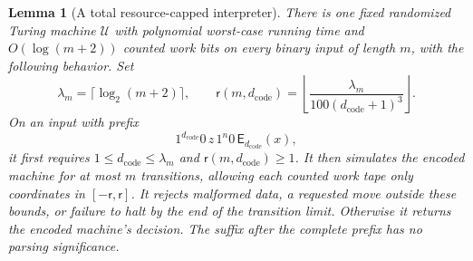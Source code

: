 \documentclass[11pt]{article}
\numberwithin{equation}{section}
\newtheorem{lemma}[theorem]{Lemma}
\theoremstyle{definition}
\theoremstyle{remark}
\begin{document}
\begin{lemma}[A total resource-capped interpreter]
\label{lem:compiler-interpreter}
There is one fixed randomized Turing machine ${\mathcal{U}}$ with polynomial
worst-case running time and $O(\log(m+2))$ counted work bits on every
binary input of length $m$, with the following behavior.
Set
\begin{equation}\label{eq:compiler-interpreter-cap}
 \lambda_m=\lceil\log_2(m+2)\rceil,
 \qquad
 {\mathsf{r}}(m,d_{\mathrm{code}})
   =\left\lfloor\frac{\lambda_m}
       {100(d_{\mathrm{code}}+1)^3}\right\rfloor.
\end{equation}
On an input with prefix
\begin{equation}\label{eq:compiler-prefix}
  1^{d_{\mathrm{code}}}0\,z\,1^n0\,
  {\mathsf{E}}_{d_{\mathrm{code}}}(x),
\end{equation}
it first requires $1\le d_{\mathrm{code}}\le\lambda_m$ and
${\mathsf{r}}(m,d_{\mathrm{code}})\ge1$.  It then simulates the encoded machine
for at most $m$ transitions, allowing each counted work tape only
coordinates in $[-{\mathsf{r}},{\mathsf{r}}]$.  It rejects malformed data, a requested move
outside these bounds, or failure to halt by the end of the transition
limit.  Otherwise it returns the encoded machine's decision.  The
suffix after the complete prefix has no parsing significance.
\end{lemma}
\end{document}
